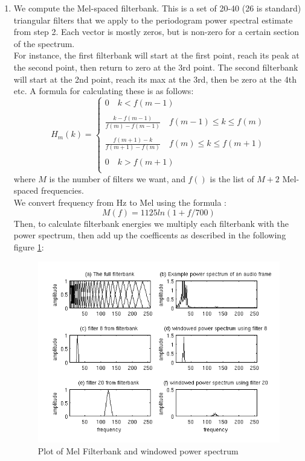 \documentclass{article} %
\begin{document}
\begin{enumerate}
		\item We compute the Mel-spaced filterbank. This is a set of 20-40 (26 is standard) triangular filters that we apply to the periodogram power spectral estimate from step 2. Each vector is mostly zeros, but is non-zero for a certain section of the spectrum. \\
		For instance, the first filterbank will start at the first point, reach its peak at the second point, then return to zero at the 3rd point. The second filterbank will start at the 2nd point, reach its max at the 3rd, then be zero at the 4th etc. A formula for calculating these is as follows:\\
		\[H_m(k) =
			\begin{cases}
				0 \quad k < f(m-1) \\\\
				\frac{k-f(m-1)}{f(m)-f(m-1)} \quad f(m-1) \leq k \leq f(m) \\\\
				\frac{f(m+1)-k}{f(m+1)-f(m)} \quad f(m) \leq k \leq f(m+1) \\\\
				0 \quad k > f(m+1) \\
			\end{cases}
		\]
		where $M$ is the number of filters we want, and $f()$ is the list of $M+2$ Mel-spaced frequencies.\\
		We convert frequency from Hz to Mel using the formula :\\
		$$ M(f) = 1125 ln(1 + f/700) $$
		Then, to calculate filterbank energies we multiply each filterbank with the power spectrum, then add up the coefficents as described in the following figure \ref{fig:melfilterbank}:
		\begin{figure}[H]
		  \includegraphics[width=\linewidth]{mel_filterbank_example}
		  \caption{Plot of Mel Filterbank and windowed power spectrum}
		  \label{fig:melfilterbank}
	  	\end{figure}


\end{enumerate}
\end{document}
